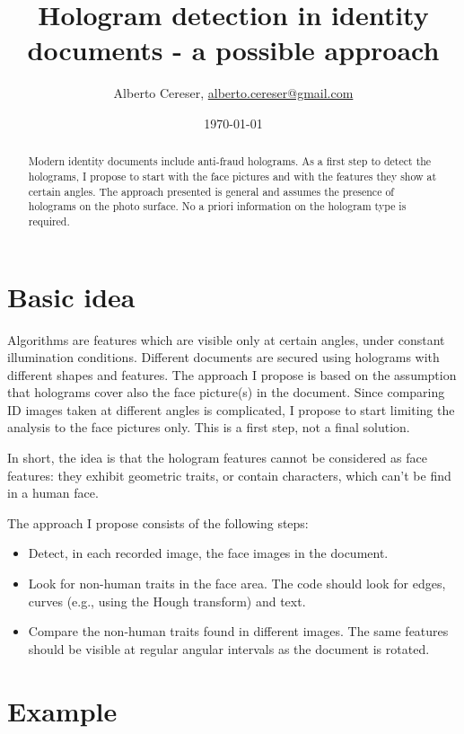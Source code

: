\documentclass[a4paper]{article}
\title{Hologram detection in identity documents - a possible approach}
\author{Alberto Cereser,
    \href{mailto:alberto.cereser@gmail.com}{alberto.cereser@gmail.com} 
}
\date{\today}
\begin{document}
\maketitle

\begin{abstract}
Modern identity documents include anti-fraud holograms. As a first step to detect the holograms, I propose to start with the face pictures and with the features they show at certain angles. The approach presented is general and assumes the presence of holograms on the photo surface. No a priori information on the hologram type is required. 
\end{abstract}

\section{Basic idea}
\label{sec:introduction}

Algorithms are features which are visible only at certain angles, under constant illumination conditions. Different documents are secured using holograms with different shapes and features. The approach I propose is based on the assumption that holograms cover also the face picture(s) in the document. Since comparing {\footnotesize{ID}} images taken at different angles is complicated, I propose to start limiting the analysis to the face pictures only. This is a first step, not a final solution. 

In short, the idea is that the hologram features cannot be considered as face features: they exhibit geometric traits, or contain characters, which can't be find in a human face. 

The approach I propose consists of the following steps:
\begin{itemize}
    \item Detect, in each recorded image, the face images in the document.
    \item Look for non-human traits in the face area. The code should look for edges, curves (e.g., using the Hough transform) and text.
    \item Compare the non-human traits found in different images. The same features should be visible at regular angular intervals as the document is rotated.
\end{itemize}

\section{Example}
\end{document}
